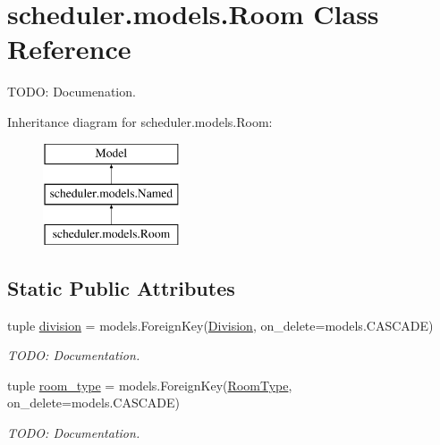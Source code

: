 \hypertarget{classscheduler_1_1models_1_1_room}{\section{scheduler.\-models.\-Room Class Reference}
\label{classscheduler_1_1models_1_1_room}
}


T\-O\-D\-O\-: Documenation.  


Inheritance diagram for scheduler.\-models.\-Room\-:\begin{figure}[H]
\begin{center}
\leavevmode
\includegraphics[height=3.000000cm]{classscheduler_1_1models_1_1_room}
\end{center}
\end{figure}
\subsection*{Static Public Attributes}
\begin{DoxyCompactItemize}
\item 
\hypertarget{classscheduler_1_1models_1_1_room_ae20a236603dca32bdaaad8e39c56f7ea}{tuple \hyperlink{classscheduler_1_1models_1_1_room_ae20a236603dca32bdaaad8e39c56f7ea}{division} = models.\-Foreign\-Key(\hyperlink{classscheduler_1_1models_1_1_division}{Division}, on\-\_\-delete=models.\-C\-A\-S\-C\-A\-D\-E)}\label{classscheduler_1_1models_1_1_room_ae20a236603dca32bdaaad8e39c56f7ea}

\begin{DoxyCompactList}\small\item\em T\-O\-D\-O\-: Documentation. \end{DoxyCompactList}\item 
\hypertarget{classscheduler_1_1models_1_1_room_ac160d40e28f0ce48c1b2843b225981ab}{tuple \hyperlink{classscheduler_1_1models_1_1_room_ac160d40e28f0ce48c1b2843b225981ab}{room\-\_\-type} = models.\-Foreign\-Key(\hyperlink{classscheduler_1_1models_1_1_room_type}{Room\-Type}, on\-\_\-delete=models.\-C\-A\-S\-C\-A\-D\-E)}\label{classscheduler_1_1models_1_1_room_ac160d40e28f0ce48c1b2843b225981ab}

\begin{DoxyCompactList}\small\item\em T\-O\-D\-O\-: Documentation. \end{DoxyCompactList}\end{DoxyCompactItemize}

